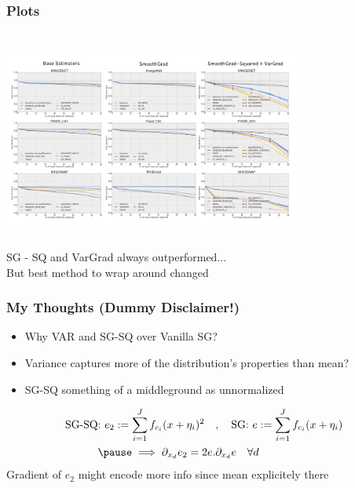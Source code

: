 \documentclass{beamer}
\theoremstyle{mystyle}
\begin{document}
\begin{frame}
	\frametitle{Plots}
	\includegraphics[width = 10cm, height=7.2cm]{all_the_plots.png}\\
	SG - SQ and VarGrad always outperformed... \pause
	\\
	But best method to wrap around changed

\end{frame}
\begin{frame}
	\frametitle{My Thoughts (Dummy Disclaimer!)}
	\begin{itemize}
	\item Why VAR and SG-SQ over Vanilla SG? \\ \pause 
	\item Variance captures more of the distribution's properties than mean?\\ \pause
	\item SG-SQ something of a middleground as unnormalized \\ \pause
	\end{itemize}
	\begin{align*}
		\text{SG-SQ:  } e_2 := \sum_{i=1}^{J} {f_{c_i} (x+\eta_i)^2} \quad &, \quad \text{SG:  } e := \sum_{i=1}^{J} {f_{c_i}(x+\eta_i)} \\
	\pause
		\implies \partial_{x_d} e_2 = 2 e . &\partial_{ x_d} e   \quad  \forall d
	\end{align*}
	Gradient of $e_2$ might encode more info since mean explicitely there
\end{frame} 
\end{document}
